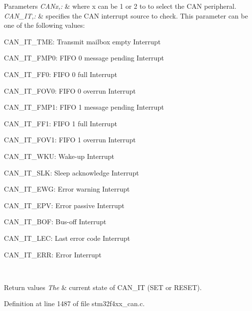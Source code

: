 \begin{DoxyParams}{Parameters}
{\em C\-A\-Nx,\-:} & where x can be 1 or 2 to to select the C\-A\-N peripheral. \\
\hline
{\em C\-A\-N\-\_\-\-I\-T,\-:} & specifies the C\-A\-N interrupt source to check. This parameter can be one of the following values\-: \begin{DoxyItemize}
\item C\-A\-N\-\_\-\-I\-T\-\_\-\-T\-M\-E\-: Transmit mailbox empty Interrupt \item C\-A\-N\-\_\-\-I\-T\-\_\-\-F\-M\-P0\-: F\-I\-F\-O 0 message pending Interrupt \item C\-A\-N\-\_\-\-I\-T\-\_\-\-F\-F0\-: F\-I\-F\-O 0 full Interrupt \item C\-A\-N\-\_\-\-I\-T\-\_\-\-F\-O\-V0\-: F\-I\-F\-O 0 overrun Interrupt \item C\-A\-N\-\_\-\-I\-T\-\_\-\-F\-M\-P1\-: F\-I\-F\-O 1 message pending Interrupt \item C\-A\-N\-\_\-\-I\-T\-\_\-\-F\-F1\-: F\-I\-F\-O 1 full Interrupt \item C\-A\-N\-\_\-\-I\-T\-\_\-\-F\-O\-V1\-: F\-I\-F\-O 1 overrun Interrupt \item C\-A\-N\-\_\-\-I\-T\-\_\-\-W\-K\-U\-: Wake-\/up Interrupt \item C\-A\-N\-\_\-\-I\-T\-\_\-\-S\-L\-K\-: Sleep acknowledge Interrupt \item C\-A\-N\-\_\-\-I\-T\-\_\-\-E\-W\-G\-: Error warning Interrupt \item C\-A\-N\-\_\-\-I\-T\-\_\-\-E\-P\-V\-: Error passive Interrupt \item C\-A\-N\-\_\-\-I\-T\-\_\-\-B\-O\-F\-: Bus-\/off Interrupt \item C\-A\-N\-\_\-\-I\-T\-\_\-\-L\-E\-C\-: Last error code Interrupt \item C\-A\-N\-\_\-\-I\-T\-\_\-\-E\-R\-R\-: Error Interrupt \end{DoxyItemize}
\\
\hline
\end{DoxyParams}

\begin{DoxyRetVals}{Return values}
{\em The} & current state of C\-A\-N\-\_\-\-I\-T (S\-E\-T or R\-E\-S\-E\-T). \\
\hline
\end{DoxyRetVals}


Definition at line 1487 of file stm32f4xx\-\_\-can.\-c.

